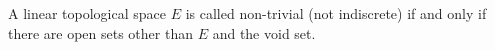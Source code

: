 A linear topological space $E$ is called non-trivial (not indiscrete) if and only if there are open sets other than $E$ and the void set.
